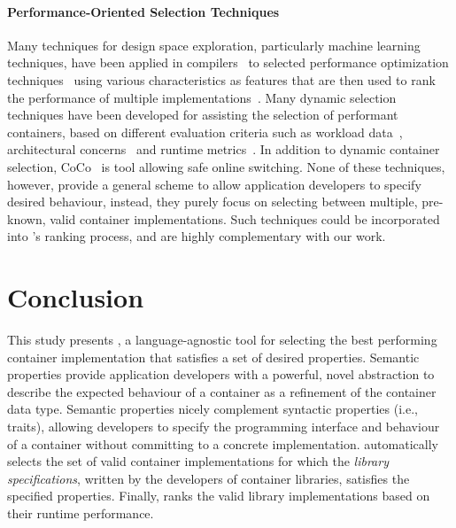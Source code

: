 \paragraph*{Performance-Oriented Selection Techniques}
Many techniques for design space exploration, particularly machine learning techniques, have been applied in compilers~\citep{fursin2011milepost} to selected performance optimization techniques~\citep{10.1109/CGO.2007.32} using various characteristics as features that are then used to rank the performance of multiple implementations~\citep{DBLP:conf/icse/SiegmundKKABRS12}.
Many dynamic selection techniques have been developed for assisting the selection of performant containers, based on different evaluation criteria such as workload data~\citep{DBLP:conf/cgo/CostaA18}, architectural concerns~\citep{DBLP:conf/pldi/JungRRCP11} and runtime metrics~\citep{DBLP:conf/pldi/ShachamVY09}. In addition to dynamic container selection, CoCo~\citep{DBLP:conf/ecoop/Xu13} is tool allowing safe online switching.
None of these techniques, however, provide a general scheme to allow application developers to specify desired behaviour, instead, they purely focus on selecting between multiple, pre-known, valid container implementations. Such techniques could be incorporated into \Primrose{}'s ranking process, and are highly complementary with our work.

\section{Conclusion}
\label{chap2:conclusion}
This study presents \Primrose{}, a language-agnostic tool for selecting the best performing container implementation that satisfies a set of desired properties.
Semantic properties provide application developers with a powerful, novel abstraction to describe the expected behaviour of a container as a refinement of the container data type.
Semantic properties nicely complement syntactic properties (i.e., traits), allowing developers to specify the programming interface and behaviour of a container without committing to a concrete implementation.
\Primrose{} automatically selects the set of valid container implementations for which the \emph{library specifications}, written by the developers of container libraries, satisfies the specified properties.
Finally, \Primrose ranks the valid library implementations based on their runtime performance.

